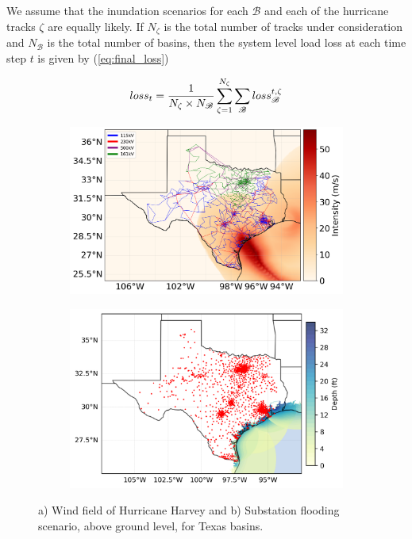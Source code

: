 We assume that the inundation scenarios for each $\mathcal{B}$ and each of the hurricane tracks $\zeta$ are equally likely. If $N_\zeta$ is the total number of tracks under consideration and $N_\mathcal{B}$ is the total number of basins, then the system level load loss at each time step $t$ is given by (\ref{eq:final_loss})

\begin{equation}
\small
    loss_t = \frac{1}{N_\zeta \times N_\mathcal{B}}\sum_{\zeta = 1}^{N_\zeta}{\sum_{\mathcal{B}} {loss_{\mathcal{B}}^{t,\zeta}}}
    \label{eq:final_loss}
\end{equation}

\begin{figure}[!ht!]
    \centering
    \begin{subfigure}[t]{0.7\textwidth}
        \centering
        \includegraphics[width=0.8\linewidth]{figures/windfield_harvey_climada.png}
        \caption{}
        \label{fig:dynamic_harvey}
    \end{subfigure}
    \begin{subfigure}[t]{0.7\textwidth}
        \centering
        \includegraphics[width=0.8\linewidth]{figures/sub_flood.png}
        \caption{}
        \label{fig:flood_scenario}
    \end{subfigure}
    \caption{a) Wind field of Hurricane Harvey and b) Substation flooding scenario, above ground level, for Texas basins.} 
    \label{fig:hurricane_flood_scenario}
\end{figure}

